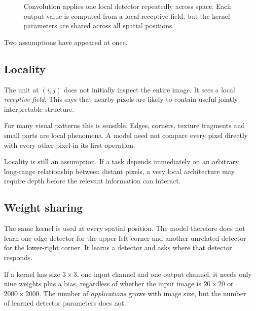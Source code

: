 \begin{figure}[ht]
  \caption{Convolution applies one local detector repeatedly across space. Each output value is computed from a local receptive field, but the kernel parameters are shared across all spatial positions.}
  \label{fig:week5-convolution}
\end{figure}

Two assumptions have appeared at once.

\subsection{Locality}

The unit at \((i,j)\) does not initially inspect the entire image. It sees a local \emph{receptive field}. This says that nearby pixels are likely to contain useful jointly interpretable structure.

For many visual patterns this is sensible. Edges, corners, texture fragments and small parts are local phenomena. A model need not compare every pixel directly with every other pixel in its first operation.

Locality is still an assumption. If a task depends immediately on an arbitrary long-range relationship between distant pixels, a very local architecture may require depth before the relevant information can interact.

\subsection{Weight sharing}

The same kernel is used at every spatial position. The model therefore does not learn one edge detector for the upper-left corner and another unrelated detector for the lower-right corner. It learns a detector and asks where that detector responds.

If a kernel has size \(3\times3\), one input channel and one output channel, it needs only nine weights plus a bias, regardless of whether the input image is \(20\times20\) or \(2000\times2000\). The number of \emph{applications} grows with image size, but the number of learned detector parameters does not.

